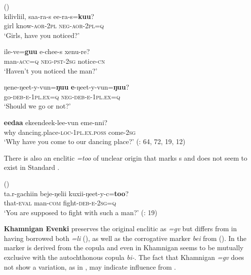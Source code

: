 \ea%
    \label{ex:tungu:8}
     ()\\
    \ea
    \gll kilivliil,  saa-ra-s    ee-ra-s=\textbf{{kuu}}?\\
    girl    know-\textsc{aor}-2\textsc{pl}  \textsc{neg}-\textsc{aor}-2\textsc{pl=q}\\
    \glt ‘Girls, have you noticed?’
   
    \ex
    \gll ile-ve=\textbf{{guu}} e-chee-s    xenu-re?\\
    man-\textsc{acc}=\textsc{q}  \textsc{neg}-\textsc{pst}-2\textsc{sg}    notice-\textsc{cn}\\
    \glt ‘Haven’t you noticed the man?’
    
    \ex
    \gll ŋene-ŋeet-y-vun=\textbf{{ŋuu}} \textbf{{e}}{-ŋeet-y-vun=}\textbf{{ŋuu}}?\\
    go-\textsc{deb}-\textsc{e}-1\textsc{pl}.\textsc{ex}=\textsc{q}    \textsc{neg}-\textsc{deb}-\textsc{e}-1\textsc{pl}.\textsc{ex}=\textsc{q}\\
    \glt ‘Should we go or not?’
    
    \ex
    \gll \textbf{{eedaa}} ekeendeek-lee-vun      eme-nni?\\
    why  dancing.place-\textsc{loc}-1\textsc{pl}.\textsc{ex}.\textsc{poss}  come-2\textsc{sg}\\
    \glt ‘Why have you come to our dancing place?’ (\citealt{BulatovaCotrozzi2004}: 64, 72, 19, 12)
    \z
    \z

There is also an enclitic \textit{=too} of unclear origin that marks s and does not seem to exist in Standard  \citep{Nedjalkov1997}.

\ea%
    \label{ex:tungu:9}
     ()\\
    \gll ta.r-gachiin  beje-ŋelii  kuxii-ŋeet-y-c=\textbf{{too}}?\\
    that-\textsc{eval}  man-\textsc{com}  fight-\textsc{deb}-\textsc{e}-2\textsc{sg}=\textsc{q}\\
    \glt ‘You are supposed to fight with such a man?’ (\citealt{BulatovaCotrozzi2004}: 19)
    \z

\textbf{Khamnigan Evenki} preserves the original enclitic as \textit{=gv} but differs from  in having borrowed both  \textit{=li} (), as well as the corrogative marker \textit{bei} from  (). In  the marker is derived from the copula and even in Khamnigan  seems to be mutually exclusive with the autochthonous copula \textit{bi-}. The fact that Khamnigan  \textit{=gv} does not show a variation, as in , may indicate influence from .

